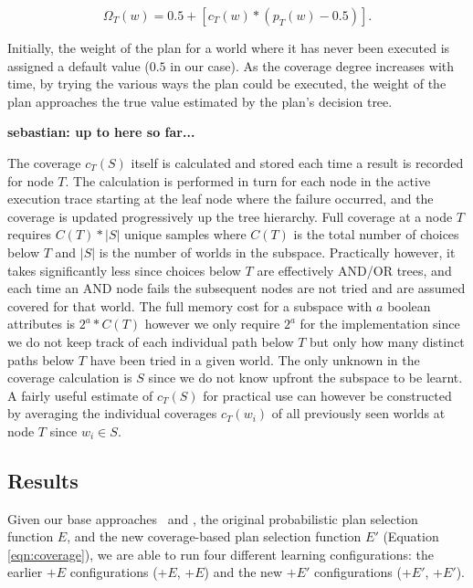 \begin{equation*}\label{eqn:coverage}   
\Omega_T(w) = 0.5 + \left[  c_T(w) *  \left( p_T(w) - 0.5 \right)  \right].
\end{equation*}
	
\noindent

	
Initially, the weight of the plan for a world where it has never been executed is
assigned a default value ($0.5$ in our case).
As the coverage degree increases with time, by trying the various ways the plan
could be executed, the weight of the plan approaches the true value estimated by
the plan's decision tree.


\textbf{sebastian: up to here so far...}

The coverage $c_T(S)$ itself is calculated and stored each time a
result is recorded for node $T$. The calculation is performed in turn
for each node in the active execution trace starting at the leaf node
where the failure occurred, and the coverage is updated progressively
up the tree hierarchy. Full coverage at a node $T$ requires $C(T)*|S|$
unique samples where $C(T)$ is the total number of choices below $T$
and $|S|$ is the number of worlds in the subspace. Practically
however, it takes significantly less since choices below $T$ are
effectively AND/OR trees, and each time an AND node fails the
subsequent nodes are not tried and are assumed covered for that
world. The full memory cost for a subspace with $a$ boolean attributes
is $2^a*C(T)$ however we only require $2^a$ for the implementation
since we do not keep track of each individual path below $T$ but only
how many distinct paths below $T$ have been tried in a given
world. The only unknown in the coverage calculation is $S$ since we do
not know upfront the subspace to be learnt. A fairly useful estimate
of $c_T(S)$ for practical use can however be constructed by averaging
the individual coverages $c_T(w_i)$ of all previously seen worlds at
node $T$ since $w_i \in S$.  

\subsection{Results}

Given our base approaches \CL\ and \BUL, the original probabilistic
plan selection function $E$, and the new coverage-based plan selection
function $E'$ (Equation \ref{eqn:coverage}), we are able to run four
different learning configurations: the earlier $+E$ configurations
(\CL+$E$, \BUL+$E$) and the new $+E'$ configurations (\CL+$E'$,
\BUL+$E'$). 

